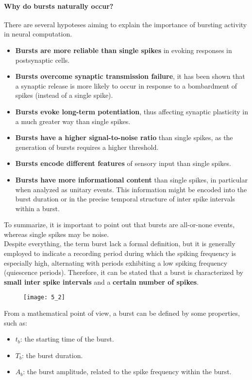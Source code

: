 \paragraph{Why do bursts naturally occur?}
There are several hypoteses aiming to explain the importance of bursting activity in
neural computation.
\begin{itemize}
    \item \textbf{Bursts are more reliable than single spikes} in evoking responses in
          postsynaptic cells.
    \item \textbf{Bursts overcome synaptic transmission failure}, it has been shown
          that a synaptic release is more likely to occur in response to a bombardment
          of spikes (instead of a single spike).
    \item \textbf{Bursts evoke long-term potentiation}, thus affecting synaptic
          plasticity in a much greater way than single spikes.
    \item \textbf{Bursts have a higher signal-to-noise ratio} than single spikes, as
          the generation of bursts requires a higher threshold.
    \item \textbf{Bursts encode different features} of sensory input than single
          spikes.
    \item \textbf{Bursts have more informational content} than single spikes, in
          particular when analyzed as unitary events. This information might be encoded
          into the burst duration or in the precise temporal structure of inter spike
          intervals within a burst.
\end{itemize}
To summarize, it is important to point out that bursts are all-or-none events,
whereas single spikes may be noise.\\
Despite everything, the term burst lack a formal definition, but it is generally employed
to indicate a recording period during which the spiking frequency is especially high,
alternating with periods exhibiting a low spiking frequency (quiescence periods). Therefore,
it can be stated that a burst is characterized by \textbf{small inter spike intervals} and a
\textbf{certain number of spikes}.
\begin{figure}[H]
    \texttt{[image: 5\_2]}
    \centering
\end{figure}
From a mathematical point of view, a burst can be defined by some properties, such as:
\begin{itemize}
    \item \(t_b\): the starting time of the burst.
    \item \(T_b\): the burst duration.
    \item \(A_b\): the burst amplitude, related to the spike frequency within the burst.
\end{itemize}

